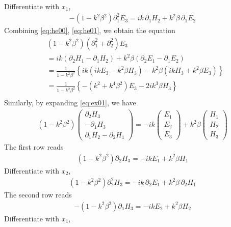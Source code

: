 Differentiate with $x_1$,
\begin{align}\label{eq:he01}
  -\left(1-k^2\beta^2\right)\partial_1^2 E_3 = ik \,\partial_1 H_2 + k^2\beta\,\partial_1 E_2
\end{align}
Combining \eqref{eq:he00}, \eqref{eq:he01}, we obtain the equation
\begin{equation}
\begin{split}
  &\left(1-k^2\beta^2\right)\left(\partial_1^2 + \partial_2^2\right)E_3 \\
  &= ik\left(\partial_2 H_1 - \partial_1 H_2\right) + k^2\beta\left(\partial_2 E_1 - \partial_1 E_2\right) \\
  &= \frac{1}{1-k^2\beta^2}\left\{ik\left(ik E_3 - k^2\beta H_3\right) - k^2\beta\left(ik H_3 + k^2\beta E_3\right)\right\} \\
  &= \frac{1}{1-k^2\beta^2}\left\{-\left(k^2 + k^4\beta^2\right)E_3 - 2 i k^3\beta H_3\right\} \\
\end{split}
\end{equation}
Similarly, by expanding \eqref{eq:ex01}, we have
\begin{align*}
  \left(1-k^2\beta^2\right)\begin{pmatrix}\partial_2 H_3\\ -\partial_1 H_3 \\ \partial_1 H_2 -\partial_2 H_1\end{pmatrix} = -ik\begin{pmatrix}E_1\\E_2\\E_3\end{pmatrix} + k^2\beta\begin{pmatrix}H_1\\H_2\\H_3\end{pmatrix}
\end{align*}
The first row reads
\begin{align*}
  \left(1-k^2\beta^2\right)\partial_2 H_3 = -ik E_1 + k^2\beta H_1
\end{align*}
Differentiate with $x_2$, 
\begin{align}\label{eq:hh00}
  \left(1-k^2\beta^2\right)\partial_2^2 H_3 = -ik \,\partial_2 E_1 + k^2\beta\,\partial_2 H_1
\end{align}
The second row reads
\begin{align*}
  -\left(1-k^2\beta^2\right)\partial_1 H_3 = -ik E_2 + k^2\beta H_2
\end{align*}
Differentiate with $x_1$,
